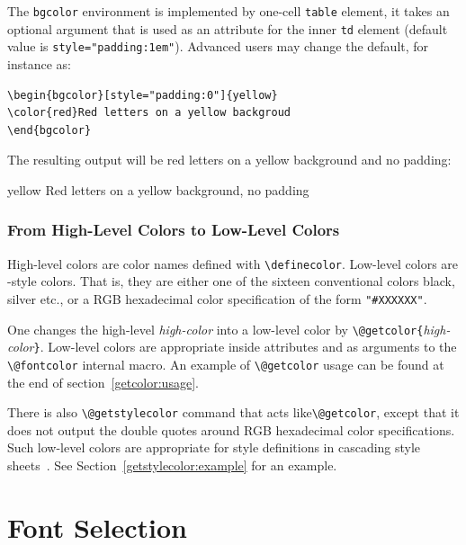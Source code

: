 The \texttt{bgcolor} environment is implemented by one-cell
\verb+table+ element, it takes an
optional argument that is used as an attribute for the inner \verb+td+
element (default value is \verb+style="padding:1em"+).
Advanced users may change the default, for instance as:
\begin{verbatim}
\begin{bgcolor}[style="padding:0"]{yellow}
\color{red}Red letters on a yellow backgroud
\end{bgcolor}
\end{verbatim}
The resulting output will be red letters
on a yellow background and no padding:
\begin{htmlonly}
\begin{bgcolor}[style="padding:0"]{yellow}
\color{red}Red letters on a yellow background, no padding
\end{bgcolor}
\end{htmlonly}


\subsubsection{From High-Level Colors to Low-Level Colors}\label{getcolor}
High-level colors are color names
defined with \verb+\definecolor+.
Low-level colors are \html-style colors.
That is, they are either one of the sixteen conventional colors black,
silver etc., or a RGB hexadecimal color specification of the form
\verb+"#XXXXXX"+.


One changes the high-level \emph{high-color} into a low-level color by
\verb+\@getcolor{+\emph{high-color}\verb+}+.
Low-level colors are appropriate inside \html{} attributes and as
arguments to the \verb+\@fontcolor+ internal macro.
An example of \verb+\@getcolor+ usage can be found at the end of
section~\ref{getcolor:usage}.

There is also \verb+\@getstylecolor+ command that acts
like\verb+\@getcolor+, except that it does not output the double
quotes around RGB hexadecimal color specifications.
Such low-level colors are appropriate for style definitions in
cascading style sheets~\cite{css}. See
Section~\ref{getstylecolor:example} for an example.


\section{Font Selection}

